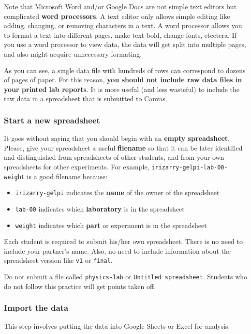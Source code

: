 Note that Microsoft Word and/or Google Docs are not simple text editors but complicated \textbf{word processors}. A text editor only allows simple editing like adding, changing, or removing characters in a text. A word processor allows you to format a text into different pages, make text bold, change fonts, etcetera. If you use a word processor to view data, the data will get split into multiple pages, and also might acquire unnecessary formating.

As you can see, a single data file with hundreds of rows can correspond to dozens of pages of paper. For this reason, \textbf{you should not include raw data files in your printed lab reports}. It is more useful (and less wasteful) to include the raw data in a spreadsheet that is submitted to Canvas.
\subsubsection{Start a new spreadsheet}
It goes without saying that you should begin with an \textbf{empty spreadsheet}. Please, give your spreadsheet a useful \textbf{filename} so that it can be later identified and distinguished from spreadsheets of other students, and from your own spreadsheets for other experiments. For example, \texttt{irizarry-gelpi-lab-00-weight} is a good filename because:
\begin{itemize}
    \item \texttt{irizarry-gelpi} indicates the \textbf{name} of the owner of the spreadsheet
    \item \texttt{lab-00} indicates which \textbf{laboratory} is in the spreadsheet
    \item \texttt{weight} indicates which \textbf{part} or experiment is in the spreadsheet
\end{itemize}
Each student is required to submit his/her own spreadsheet. There is no need to include your partner's name. Also, no need to include information about the spreadsheet version like \texttt{v1} or \texttt{final}.

Do not submit a file called \texttt{physics-lab} or \texttt{Untitled spreadsheet}. Students who do not follow this practice will get points taken off.
\subsubsection{Import the data}
This step involves putting the data into Google Sheets or Excel for analysis.

